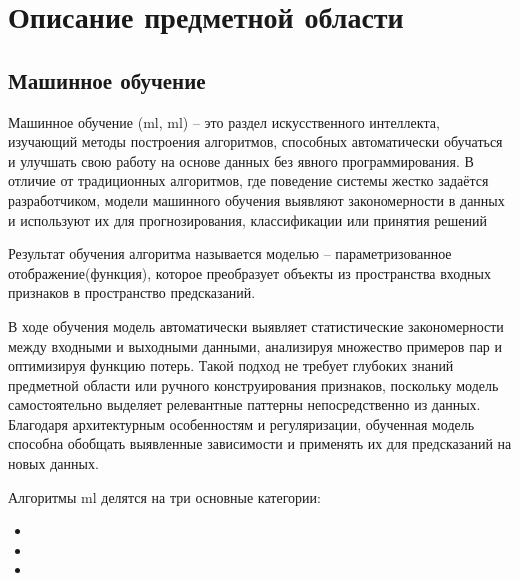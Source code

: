 \documentclass[../document.tex]{subfiles}
\begin{document}
    \section{Описание предметной области}
    \subsection{Машинное обучение}
    \par Машинное обучение (\acrlong{ml}, \acrshort{ml}) -- это раздел искусственного интеллекта, изучающий методы построения алгоритмов, способных автоматически обучаться и улучшать свою работу на основе данных без явного программирования. В отличие от традиционных алгоритмов, где поведение системы жестко задаётся разработчиком, модели машинного обучения выявляют закономерности в данных и используют их для прогнозирования, классификации или принятия решений
    \par Результат обучения алгоритма называется моделью -- параметризованное отображение(функция), которое преобразует объекты из пространства входных признаков в пространство предсказаний.
    \par В ходе обучения модель автоматически выявляет статистические закономерности между входными и выходными данными, анализируя множество примеров пар и оптимизируя функцию потерь. Такой подход не требует глубоких знаний предметной области или ручного конструирования признаков, поскольку модель самостоятельно выделяет релевантные паттерны непосредственно из данных. Благодаря архитектурным особенностям и регуляризации, обученная модель способна обобщать выявленные зависимости и применять их для предсказаний на новых данных.
    \par Алгоритмы \acrshort{ml} делятся на три основные категории:
    \begin{itemize}
        \item {}
        \item {}
        \item {}
    \end{itemize} 

    

    

    

    
    
    
    
    
\end{document}
